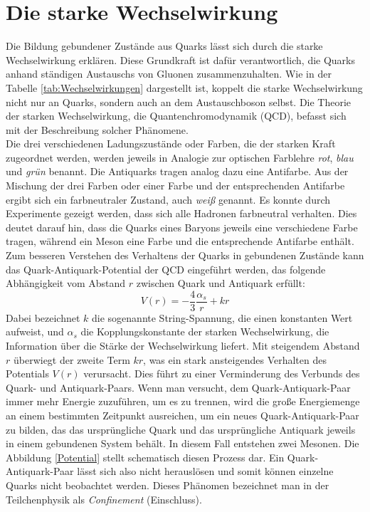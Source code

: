 \documentclass[12pt,a4paper]{report}
\begin{document}
\section{Die starke Wechselwirkung}
\label{sec:starkeWW}
Die Bildung gebundener Zustände aus Quarks lässt sich durch die starke Wechselwirkung erklären. Diese Grundkraft ist dafür verantwortlich, die Quarks anhand ständigen Austauschs von Gluonen zusammenzuhalten. Wie in der Tabelle \ref{tab:Wechselwirkungen} dargestellt ist, koppelt die starke Wechselwirkung nicht nur an Quarks, sondern auch an dem Austauschboson selbst. Die Theorie der starken Wechselwirkung, die Quantenchromodynamik (QCD), befasst sich mit der Beschreibung solcher Phänomene. \\
Die drei verschiedenen Ladungszustände oder Farben, die der starken Kraft zugeordnet werden, werden jeweils in Analogie zur optischen Farblehre \textit{rot}, \textit{blau} und \textit{grün} benannt. Die Antiquarks tragen analog dazu eine Antifarbe. Aus der Mischung der drei Farben oder einer Farbe und der entsprechenden Antifarbe ergibt sich ein farbneutraler Zustand, auch \textit{weiß} genannt. Es konnte durch Experimente gezeigt werden, dass sich alle Hadronen farbneutral verhalten. Dies deutet darauf hin, dass die Quarks eines Baryons jeweils eine verschiedene Farbe tragen, während ein Meson eine Farbe und die entsprechende Antifarbe enthält.\\
Zum besseren Verstehen des Verhaltens der Quarks in gebundenen Zustände kann das Quark-Antiquark-Potential der QCD eingeführt werden, das folgende Abhängigkeit vom Abstand $r$ zwischen Quark und Antiquark erfüllt:
\begin{equation} \label{eq:PotentialQCD}
  V(r)=-\dfrac{4}{3}\dfrac{\alpha_{s}}{r}+kr
\end{equation}
Dabei bezeichnet $k$ die sogenannte String-Spannung, die einen konstanten Wert aufweist, und $\alpha_{s}$ die Kopplungskonstante der starken Wechselwirkung, die Information über die Stärke der Wechselwirkung liefert. Mit steigendem Abstand $r$ überwiegt der zweite Term $kr$, was ein stark ansteigendes Verhalten des Potentials $V(r)$ verursacht. Dies führt zu einer Verminderung des Verbunds des Quark- und Antiquark-Paars. Wenn man versucht, dem Quark-Antiquark-Paar immer mehr Energie zuzuführen, um es zu trennen, wird die große Energiemenge an einem bestimmten Zeitpunkt ausreichen, um ein neues Quark-Antiquark-Paar zu bilden, das das ursprüngliche Quark und das ursprüngliche Antiquark jeweils in einem gebundenen System behält. In diesem Fall entstehen zwei Mesonen. Die Abbildung \ref{Potential} stellt schematisch diesen Prozess dar. Ein Quark-Antiquark-Paar lässt sich also nicht herauslösen und somit können einzelne Quarks nicht beobachtet werden. Dieses Phänomen bezeichnet man in der Teilchenphysik als \textit{Confinement} (Einschluss). 
\end{document}
